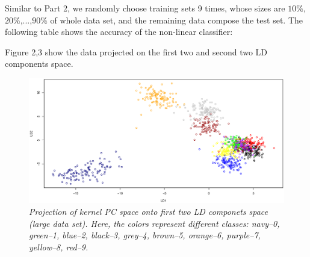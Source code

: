\documentclass{article}
\begin{document}
Similar to Part 2, we randomly choose training sets 9 times, whose sizes are $10\%$,$20\%$,...,$90\%$ 
of whole data set, and the remaining data compose the test set. The following table shows the accuracy of the non-linear classifier:

 
Figure 2,3 show the data projected on the first two and second two LD components space.

\begin{figure}[htp]
\centering
\includegraphics[width=12.1cm]{large_kpca_lda_poly_LD12.eps}
\caption{\textit{Projection of kernel PC space onto first two LD componets space (large data set). Here, the colors represent different classes: navy--0, green--1, 
blue--2, black--3, grey--4, brown--5, orange--6, purple--7, yellow--8, red--9.}}
\end{figure}
\end{document}
